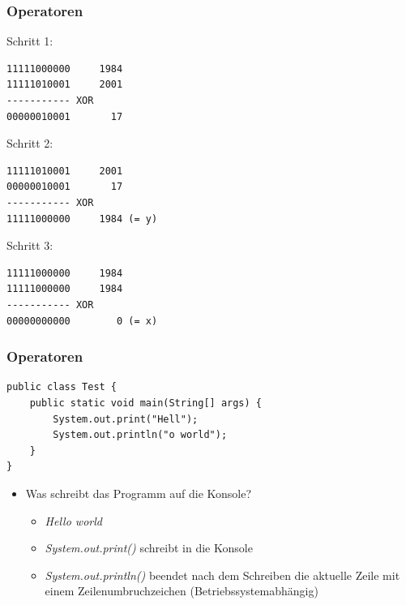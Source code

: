 \documentclass{beamer}
\begin{document}
\begin{frame}[fragile]
\frametitle{Operatoren}

Schritt 1:

\begin{lstlisting}
11111000000     1984
11111010001     2001
----------- XOR
00000010001       17
\end{lstlisting}

Schritt 2:

\begin{lstlisting}
11111010001     2001
00000010001       17
----------- XOR
11111000000     1984 (= y)
\end{lstlisting}

Schritt 3:

\begin{lstlisting}
11111000000     1984
11111000000     1984
----------- XOR
00000000000        0 (= x)
\end{lstlisting}

\end{frame}

\begin{frame}[fragile]
\frametitle{Operatoren}

\begin{lstlisting}
public class Test {
	public static void main(String[] args) {
		System.out.print("Hell");
		System.out.println("o world");
	}
}
\end{lstlisting}

\begin{itemize}
\item Was schreibt das Programm auf die Konsole?
	\begin{itemize}
	\item \textit{Hello world}
	\item \textit{System.out.print()} schreibt in die Konsole
	\item \textit{System.out.println()} beendet nach dem Schreiben die aktuelle Zeile mit einem Zeilenumbruchzeichen (Betriebssystemabh\"angig)
	\end{itemize}
\end{itemize}

\end{frame}
\end{document}
